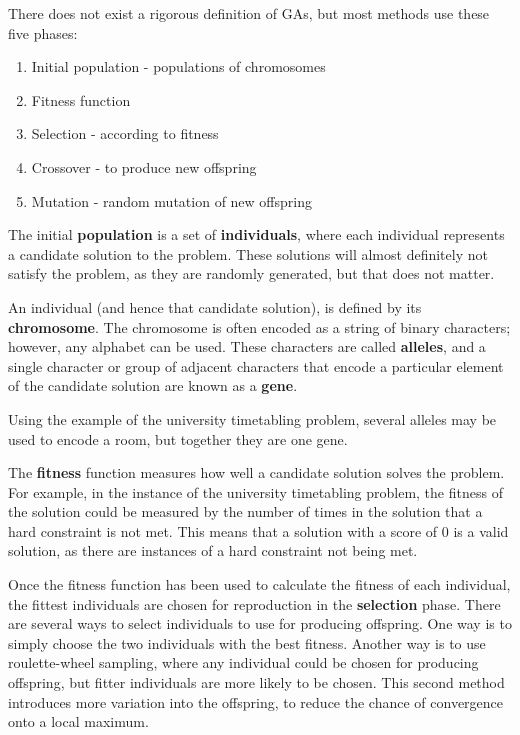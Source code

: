 \documentclass[a4paper, 12pt]{report}
\begin{document}
There does not exist a rigorous definition of GAs, but most methods use these
five phases:

\begin{enumerate}
	\item Initial population - populations of chromosomes
	\item Fitness function
	\item Selection - according to fitness
	\item Crossover - to produce new offspring
	\item Mutation - random mutation of new offspring
\end{enumerate}

The initial \textbf{population} is a set of \textbf{individuals}, where each
individual represents a candidate solution to the problem. These solutions will
almost definitely not satisfy the problem, as they are randomly generated, but
that does not matter.

An individual (and hence that candidate solution), is defined by its
\textbf{chromosome}. The chromosome is often encoded as a string of binary
characters; however, any alphabet can be used. These characters are called
\textbf{alleles}, and a single character or group of adjacent characters that
encode a particular element of the candidate solution are known as a
\textbf{gene}.

Using the example of the university timetabling problem, several alleles may be
used to encode a room, but together they are one gene.

The \textbf{fitness} function measures how well a candidate solution solves the
problem. For example, in the instance of the university timetabling problem,
the fitness of the solution could be measured by the number of times in the
solution that a hard constraint is not met. This means that a solution with a
score of 0 is a valid solution, as there are instances of a hard constraint not
being met.

Once the fitness function has been used to calculate the fitness of each
individual, the fittest individuals are chosen for reproduction in the
\textbf{selection} phase. There are several ways to select individuals to use
for producing offspring. One way is to simply choose the two individuals with
the best fitness. Another way is to use roulette-wheel sampling, where any
individual could be chosen for producing offspring, but fitter individuals are
more likely to be chosen. This second method introduces more variation into the
offspring, to reduce the chance of convergence onto a local maximum.
\end{document}
